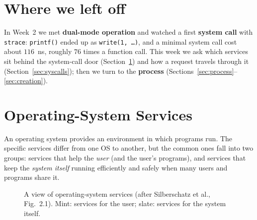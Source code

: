\documentclass[11pt,a4paper]{article}
\newcommand{\term}[1]{\textbf{\color{mintdeep}#1}}
\newcommand{\cmd}[1]{\texttt{#1}}
\begin{document}
\setcounter{tocdepth}{1}
\tableofcontents

\section*{Where we left off}
In Week~2 we met \term{dual-mode operation} and watched a first \term{system call} with \cmd{strace}: \cmd{printf()} ended up as \cmd{write(1, \dots)}, and a minimal system call cost about $116$~ns, roughly $76$ times a function call. This week we ask which services sit behind the system-call door (Section~\ref{sec:services}) and how a request travels through it (Section~\ref{sec:syscalls}); then we turn to the \term{process} (Sections~\ref{sec:process}--\ref{sec:creation}).

\section{Operating-System Services}
\label{sec:services}

An operating system provides an environment in which programs run. The specific services differ from one OS to another, but the common ones fall into two groups: services that help the \emph{user} (and the user's programs), and services that keep the \emph{system itself} running efficiently and safely when many users and programs share it.

\begin{figure}[H]
\centering
{}
\caption{A view of operating-system services (after Silberschatz et al., Fig.~2.1). Mint: services for the user; slate: services for the system itself.}
\end{figure}
\end{document}
